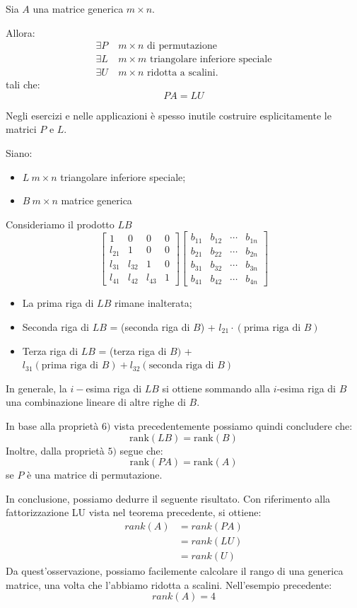 \documentclass[12pt]{report}
\newcounter{theorem}
\begin{document}
\begin{theorem}{}{}
	Sia $A$ una matrice generica $m \times n$.

	Allora:
	\begin{align*}
		\exists P&\ m \times n \text{ di permutazione} \\
		\exists L&\ m \times m \text{ triangolare inferiore speciale} \\
		\exists U&\ m \times n \text{ ridotta a scalini}.
	\end{align*}
	tali che:
	\[
	PA = LU
	\]
\end{theorem}
Negli esercizi e nelle applicazioni è spesso inutile costruire esplicitamente le matrici $P$ e $L$.
\begin{note}{}{}
Siano:
\begin{itemize}
	\item $L\ m \times n$ triangolare inferiore speciale;
	\item $B\ m \times n$ matrice generica
\end{itemize}
Consideriamo il prodotto $LB$
\[
\begin{bmatrix}
	1 & 0 & 0 & 0 \\
	l_{21} & 1 & 0 & 0 \\
	l_{31} & l_{32} & 1 & 0 \\
	l_{41} & l_{42} & l_{43} & 1
\end{bmatrix}\begin{bmatrix}
	b_{11} & b_{12} & \cdots & b_{1n} \\
	b_{21} & b_{22} & \cdots & b_{2n} \\
	b_{31} & b_{32} & \cdots & b_{3n} \\
	b_{41} & b_{42} & \cdots & b_{4n}
\end{bmatrix}
\]
\begin{itemize}
	\item La prima riga di $LB$ rimane inalterata;
	\item Seconda riga di $LB$ = (seconda riga di $B$) + $l_{21} \cdot (\text{prima riga di }B)$
	\item Terza riga di $LB$ = (terza riga di $B)$ + $l_{31}(\text{prima riga di }B) + l_{32}(\text{seconda riga di }B)$
\end{itemize}
In generale, la $i-$esima riga di $LB$ si ottiene sommando alla $i$-esima riga di $B$ una combinazione lineare di altre righe di $B$.

In base alla proprietà $6)$ vista precedentemente possiamo quindi concludere che:
\[
\text{rank}(LB) = \text{rank}(B)
\]
Inoltre, dalla proprietà $5)$ segue che:
\[
\text{rank}(PA) = \text{rank}(A)
\]
se $P$ è una matrice di permutazione.

In conclusione, possiamo dedurre il seguente risultato. Con riferimento alla fattorizzazione LU vista nel teorema precedente, si ottiene:
\begin{align*}
	rank(A) &= rank(PA) \\
	&= rank(LU) \\
	&= rank(U)
\end{align*}
Da quest'osservazione, possiamo facilemente calcolare il rango di una generica matrice, una volta che l'abbiamo ridotta a scalini. Nell'esempio precedente:
\[
rank(A) = 4
\]
\end{note}
\end{document}
